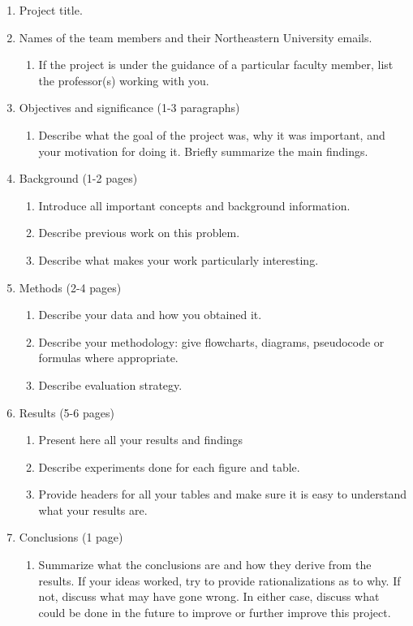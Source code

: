 \documentclass[twoside]{article}
\begin{document}
\begin{enumerate}
\item Project title.
\item Names of the team members and their Northeastern University emails.
     \begin{enumerate}
     \item If the project is under the guidance of a particular faculty member, list the professor(s) working with you.
     \end{enumerate}
\item Objectives and significance (1-3 paragraphs)
     \begin{enumerate}
     \item Describe what the goal of the project was, why it was important, and your motivation for doing it. Briefly summarize the main findings.
     \end{enumerate}
\item Background (1-2 pages)
     \begin{enumerate}
     \item Introduce all important concepts and background information.
     \item Describe previous work on this problem.
     \item Describe what makes your work particularly interesting. 
     \end{enumerate}
\item Methods (2-4 pages)
     \begin{enumerate}
     \item Describe your data and how you obtained it.
     \item Describe your methodology: give flowcharts, diagrams, pseudocode or formulas where appropriate.
     \item Describe evaluation strategy.
     \end{enumerate}
     
\item Results (5-6 pages)
     \begin{enumerate}
     \item Present here all your results and findings
     \item Describe experiments done for each figure and table.
     \item Provide headers for all your tables and make sure it is easy to understand what your results are.
     \end{enumerate}

\item Conclusions (1 page)
     \begin{enumerate}
     \item Summarize what the conclusions are and how they derive from the results. If your ideas worked, try to provide rationalizations as to why. If not, discuss what may have gone wrong. In either case, discuss what could be done in the future to improve or further improve this project.
     \end{enumerate}


\end{enumerate}
\end{document}
